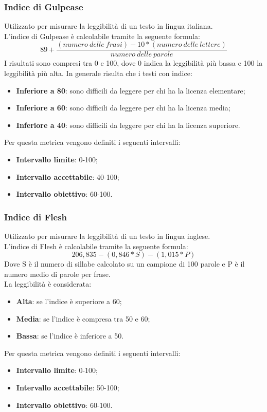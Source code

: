 \subsubsection{Indice di Gulpease}
Utilizzato per misurare la leggibilità di un testo in lingua italiana.\\
L'indice di Gulpease è calcolabile tramite la seguente formula:
$$
	89+\frac{(numero\:delle\:frasi)-10*(numero\:delle\:lettere)}{numero\:delle\:parole}
$$
I risultati sono compresi tra 0 e 100, dove 0 indica la leggibilità più bassa e 100 la leggibilità più alta. In generale risulta che i testi con indice:
	\begin{itemize}
		\item{\textbf{Inferiore	a 80}}: sono difficili da leggere per chi ha la licenza elementare;
		\item{\textbf{Inferiore	a 60}}: sono difficili da leggere per chi ha la licenza media;
		\item{\textbf{Inferiore	a 40}}: sono difficili da leggere per chi ha la licenza superiore.
	\end{itemize}
Per questa metrica vengono definiti i seguenti intervalli: 
	\begin{itemize}
		\item{\textbf{Intervallo limite}: 0-100;}
		\item{\textbf{Intervallo accettabile}: 40-100;}
		\item{\textbf{Intervallo obiettivo}: 60-100.}
	\end{itemize}
\subsubsection{Indice di Flesh}
Utilizzato per misurare la leggibilità di un testo in lingua inglese.\\
L'indice di Flesh è calcolabile tramite la seguente formula:
	$$
		206,835-(0,846*S)-(1,015*P)
	$$
Dove S è il numero di sillabe calcolato su un campione di 100 parole e P è il numero medio di parole per frase.\\
La leggibilità è considerata:
	\begin{itemize}
		\item{\textbf{Alta}}: se l'indice è superiore a 60;
		\item{\textbf{Media}}: se l'indice è compresa tra 50 e 60;
		\item{\textbf{Bassa}}: se l'indice è inferiore a 50.
	\end{itemize}
Per questa metrica vengono definiti i seguenti intervalli: 
\begin{itemize}
	\item{\textbf{Intervallo limite}: 0-100;}
	\item{\textbf{Intervallo accettabile}: 50-100;}
	\item{\textbf{Intervallo obiettivo}: 60-100.}
\end{itemize} 

